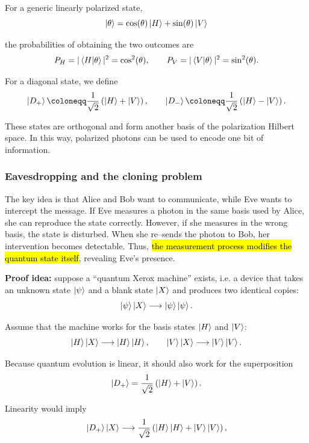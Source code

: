 For a generic linearly polarized state,
\begin{equation}\label{eqn:5-generic-linear-polarization}
    \ket{\theta} = \cos(\theta)\ket{H} + \sin(\theta)\ket{V}
\end{equation}

the probabilities of obtaining the two outcomes are
\[
P_H = |\braket{H|\theta}|^2 = \cos^2(\theta),
\qquad
P_V = |\braket{V|\theta}|^2 = \sin^2(\theta).
\]

For a diagonal state, we define
\[
\ket{D_+} \coloneqq
\frac{1}{\sqrt{2}}\left(\ket{H}+\ket{V}\right),
\qquad
\ket{D_-} \coloneqq
\frac{1}{\sqrt{2}}\left(\ket{H}-\ket{V}\right).
\]

These states are orthogonal and form another basis of the polarization Hilbert space. In this way, polarized photons can be used to encode one bit of information.

\subsubsection{Eavesdropping and the cloning problem}

The key idea is that Alice and Bob want to communicate, while Eve wants to intercept the message. If Eve measures a photon in the same basis used by Alice, she can reproduce the state correctly. However, if she measures in the wrong basis, the state is disturbed. When she re--sends the photon to Bob, her intervention becomes detectable. Thus, \hl{the measurement process modifies the quantum state itself}, revealing Eve's presence.


\textbf{Proof idea:} suppose a ``quantum Xerox machine'' exists, i.e. a device that takes an unknown state $\ket{\psi}$ and a blank state $\ket{X}$ and produces two identical copies:
\[
\ket{\psi}\ket{X} \longrightarrow \ket{\psi}\ket{\psi}.
\]

Assume that the machine works for the basis states $\ket{H}$ and $\ket{V}$:
\[
\ket{H}\ket{X} \longrightarrow \ket{H}\ket{H},
\qquad
\ket{V}\ket{X} \longrightarrow \ket{V}\ket{V}.
\]

Because quantum evolution is linear, it should also work for the superposition
\[
\ket{D_+} = \frac{1}{\sqrt{2}}\left(\ket{H}+\ket{V}\right).
\]

Linearity would imply
\[
\ket{D_+}\ket{X} \longrightarrow \frac{1}{\sqrt{2}}\left(\ket{H}\ket{H}+\ket{V}\ket{V}\right),
\]

